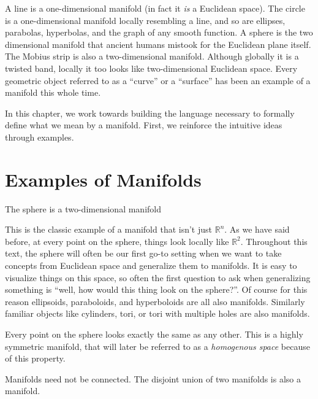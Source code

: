 	A line is a one-dimensional manifold (in fact it \emph{is} a Euclidean space).  The circle is a one-dimensional manifold locally resembling a line, and so are ellipses, parabolas, hyperbolas, and the graph of any smooth function. A sphere is the two dimensional manifold that ancient humans mistook for the Euclidean plane itself. The Mobius strip is also a two-dimensional manifold. Although globally it is a twisted band, locally it too looks like two-dimensional Euclidean space. Every geometric object referred to as a ``curve'' or a ``surface'' has been an example of a manifold this whole time. 
	
	In this chapter, we work towards building the language necessary to formally define what we mean by a manifold. First, we reinforce the intuitive ideas through examples.
	
	
	\section{Examples of Manifolds} %
	\label{sec:examples_of_manifolds}
	
	\begin{example}
		The sphere is a two-dimensional manifold
	\end{example}
	
		This is the classic example of a manifold that isn't just $\mathbb R^n$. As we have said before, at every point on the sphere, things look locally like $\mathbb R^2$. Throughout this text, the sphere will often be our first go-to setting when we want to take concepts from Euclidean space and generalize them to manifolds. It is easy to visualize things on this space, so often the first question to ask when generalizing something is ``well, how would this thing look on the sphere?''. Of course for this reason ellipsoids, paraboloids, and hyperboloids are all also manifolds. Similarly familiar objects like cylinders, tori, or tori with multiple holes are also manifolds.
		
		Every point on the sphere looks exactly the same as any other. This is a highly symmetric manifold, that will later be referred to as a \emph{homogenous space} because of this property.
	
	\begin{example}
		Manifolds need not be connected. The disjoint union of two manifolds is also a manifold.
	\end{example}
	
